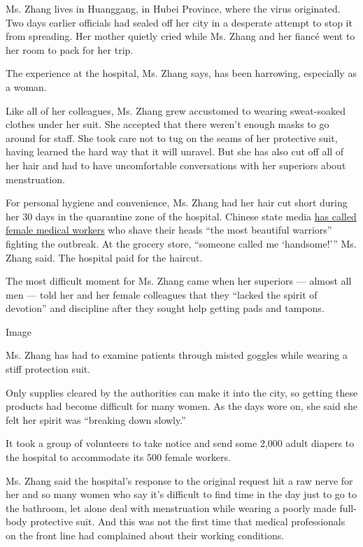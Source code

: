 Ms. Zhang lives in Huanggang, in Hubei Province, where the virus
originated. Two days earlier officials had sealed off her city in a
desperate attempt to stop it from spreading. Her mother quietly cried
while Ms. Zhang and her fiancé went to her room to pack for her trip.

The experience at the hospital, Ms. Zhang says, has been harrowing,
especially as a woman.

Like all of her colleagues, Ms. Zhang grew accustomed to wearing
sweat-soaked clothes under her suit. She accepted that there weren't
enough masks to go around for staff. She took care not to tug on the
seams of her protective suit, having learned the hard way that it will
unravel. But she has also cut off all of her hair and had to have
uncomfortable conversations with her superiors about menstruation.

For personal hygiene and convenience, Ms. Zhang had her hair cut short
during her 30 days in the quarantine zone of the hospital. Chinese state
media \href{https://www.youtube.com/watch?v=4Htr2SdoP0k}{has called
female medical workers} who shave their heads ``the most beautiful
warriors'' fighting the outbreak. At the grocery store, ``someone called
me `handsome!''' Ms. Zhang said. The hospital paid for the haircut.

The most difficult moment for Ms. Zhang came when her superiors ---
almost all men --- told her and her female colleagues that they ``lacked
the spirit of devotion'' and discipline after they sought help getting
pads and tampons.

Image

Ms. Zhang has had to examine patients through misted goggles while
wearing a stiff protection suit.

Only supplies cleared by the authorities can make it into the city, so
getting these products had become difficult for many women. As the days
wore on, she said she felt her spirit was ``breaking down slowly.''

It took a group of volunteers to take notice and send some 2,000 adult
diapers to the hospital to accommodate its 500 female workers.

Ms. Zhang said the hospital's response to the original request hit a raw
nerve for her and so many women who say it's difficult to find time in
the day just to go to the bathroom, let alone deal with menstruation
while wearing a poorly made full-body protective suit. And this was not
the first time that medical professionals on the front line had
complained about their working conditions.


